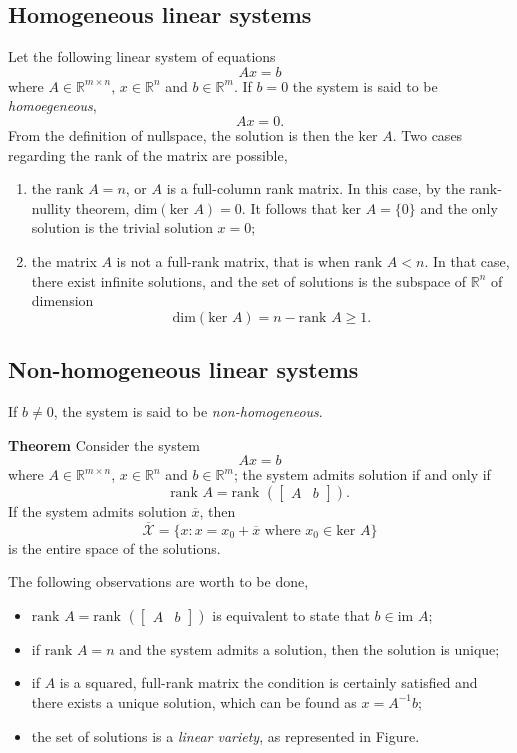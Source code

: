 \documentclass[10pt]{report}
\begin{document}
\subsection{Homogeneous linear systems}
\label{sec:orga4ef366}
Let the following linear system of equations $$Ax = b$$ where \(A \in\mathbb{R}^{m\times n}\), \(x\in\mathbb{R}^n\) and \(b\in\mathbb{R}^m\). If \(b=0\) the system is said to be \emph{homoegeneous}, $$Ax=0.$$ From the definition of nullspace, the solution is then the \(\mbox{ker }A\). Two cases regarding the rank of the matrix are possible,
\begin{enumerate}
\item the \(\mbox{rank }A = n\), or \(A\) is a full\--column rank matrix. In this case, by the rank\--nullity theorem, \(\mbox{dim}(\mbox{ker }A) = 0\). It follows that \(\mbox{ker }A = \{0\}\) and the only solution is the trivial solution \(x = 0\);
\item the matrix \(A\) is not a full\--rank matrix, that is when \(\mbox{rank }A < n\). In that case, there exist infinite solutions, and the set of solutions is the subspace of \(\mathbb{R}^n\) of dimension $$\mbox{dim}(\mbox{ker }A) = n - \mbox{rank }A \geq 1.$$
\end{enumerate}
\subsection{Non\--homogeneous linear systems}
\label{sec:org2b5ded1}
If \(b \neq 0\), the system is said to be \emph{non\--homogeneous}.

\textbf{Theorem} Consider the system $$Ax = b$$ where \(A \in\mathbb{R}^{m\times n}\), \(x\in\mathbb{R}^n\) and \(b\in\mathbb{R}^m\); the system admits solution if and only if $$\mbox{rank }A = \mbox{rank }\left(\begin{bmatrix} A & b \end{bmatrix}\right).$$ If the system admits solution \(\overline x\), then $$ \overline{\mathcal{X}} = \{x:x = x_0 + \overline x \mbox{ where } x_0 \in \mbox{ker }A\}$$ is the entire space of the solutions.

The following observations are worth to be done,
\begin{itemize}
\item \(\mbox{rank }A = \mbox{rank }\left(\begin{bmatrix} A & b \end{bmatrix}\right)\) is equivalent to state that \(b \in \mbox{im }A\);
\item if \(\mbox{rank }A = n\) and the system admits a solution, then the solution is unique;
\item if \(A\) is a squared, full\--rank matrix the condition is certainly satisfied and there exists a unique solution, which can be found as \(x = A^{-1}b\);
\item the set of solutions is a \emph{linear variety}, as represented in Figure.
\end{itemize}
\end{document}
